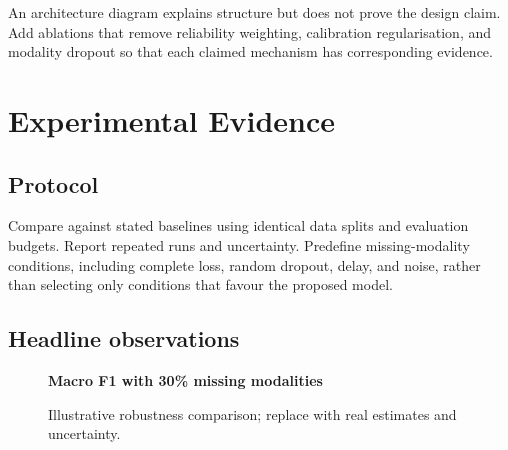 \begin{keypoint}
An architecture diagram explains structure but does not prove the design claim. Add ablations that remove reliability weighting, calibration regularisation, and modality dropout so that each claimed mechanism has corresponding evidence.
\end{keypoint}

\chapter{Experimental Evidence}\label{ch:m-results}
\section{Protocol}
Compare against stated baselines using identical data splits and evaluation budgets. Report repeated runs and uncertainty. Predefine missing-modality conditions, including complete loss, random dropout, delay, and noise, rather than selecting only conditions that favour the proposed model.

\section{Headline observations}
\begin{center}
\begin{minipage}{0.30\textwidth}\end{minipage}\hfill
\begin{minipage}{0.30\textwidth}\end{minipage}\hfill
\begin{minipage}{0.30\textwidth}\end{minipage}
\end{center}

\begin{figure}[htbp]
\centering
\begin{minipage}{0.84\textwidth}
{\sffamily\bfseries\color{ISISDeepBlue}Macro F1 with 30\% missing modalities\par\vspace{3mm}}
\end{minipage}
\caption{Illustrative robustness comparison; replace with real estimates and uncertainty.}
\label{fig:m-results}
\end{figure}

